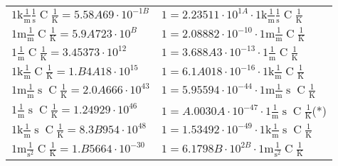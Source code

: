 \begin{center}
\begin{longtable}{l l}
{\color{gray}$1 \bm{\mathrm{ k}}\frac1{\operatorname{m}}\frac1{\operatorname{s}}{\operatorname{C}}\frac1{\operatorname{K}} = 5.58A69\cdot10^{-1B} $}   & {\color{gray}$ 1 = 2.23511\cdot10^{1A} \cdot 1 \bm{\mathrm{ k}}\frac1{\operatorname{m}}\frac1{\operatorname{s}}{\operatorname{C}}\frac1{\operatorname{K}}$}  \\
{\color{gray}$1 \bm{\mathrm{ m}}\frac1{\operatorname{m}}{}{\operatorname{C}}\frac1{\operatorname{K}} = 5.9A723\cdot10^{B} $}   & {\color{gray}$ 1 = 2.08882\cdot10^{-10} \cdot 1 \bm{\mathrm{ m}}\frac1{\operatorname{m}}{}{\operatorname{C}}\frac1{\operatorname{K}}$}  \\
{\color{black}$1 \bm{\mathrm{ }}\frac1{\operatorname{m}}{}{\operatorname{C}}\frac1{\operatorname{K}} = 3.45373\cdot10^{12} $}   & {\color{black}$ 1 = 3.688A3\cdot10^{-13} \cdot 1 \bm{\mathrm{ }}\frac1{\operatorname{m}}{}{\operatorname{C}}\frac1{\operatorname{K}}$}  \\
{\color{gray}$1 \bm{\mathrm{ k}}\frac1{\operatorname{m}}{}{\operatorname{C}}\frac1{\operatorname{K}} = 1.B4A18\cdot10^{15} $}   & {\color{gray}$ 1 = 6.1A018\cdot10^{-16} \cdot 1 \bm{\mathrm{ k}}\frac1{\operatorname{m}}{}{\operatorname{C}}\frac1{\operatorname{K}}$}  \\
{\color{gray}$1 \bm{\mathrm{ m}}\frac1{\operatorname{m}}{\operatorname{s}}{\operatorname{C}}\frac1{\operatorname{K}} = 2.0A666\cdot10^{43} $}   & {\color{gray}$ 1 = 5.95594\cdot10^{-44} \cdot 1 \bm{\mathrm{ m}}\frac1{\operatorname{m}}{\operatorname{s}}{\operatorname{C}}\frac1{\operatorname{K}}$}  \\
{\color{black}$1 \bm{\mathrm{ }}\frac1{\operatorname{m}}{\operatorname{s}}{\operatorname{C}}\frac1{\operatorname{K}} = 1.24929\cdot10^{46} $}   & {\color{black}$ 1 = A.0030A\cdot10^{-47} \cdot 1 \bm{\mathrm{ }}\frac1{\operatorname{m}}{\operatorname{s}}{\operatorname{C}}\frac1{\operatorname{K}}$}\quad(*)\\
{\color{gray}$1 \bm{\mathrm{ k}}\frac1{\operatorname{m}}{\operatorname{s}}{\operatorname{C}}\frac1{\operatorname{K}} = 8.3B954\cdot10^{48} $}   & {\color{gray}$ 1 = 1.53492\cdot10^{-49} \cdot 1 \bm{\mathrm{ k}}\frac1{\operatorname{m}}{\operatorname{s}}{\operatorname{C}}\frac1{\operatorname{K}}$}  \\
{\color{gray}$1 \bm{\mathrm{ m}}{}\frac1{\operatorname{s}^2}{\operatorname{C}}\frac1{\operatorname{K}} = 1.B5664\cdot10^{-30} $}   & {\color{gray}$ 1 = 6.1798B\cdot10^{2B} \cdot 1 \bm{\mathrm{ m}}{}\frac1{\operatorname{s}^2}{\operatorname{C}}\frac1{\operatorname{K}}$}  \\

\end{longtable}
\end{center}
